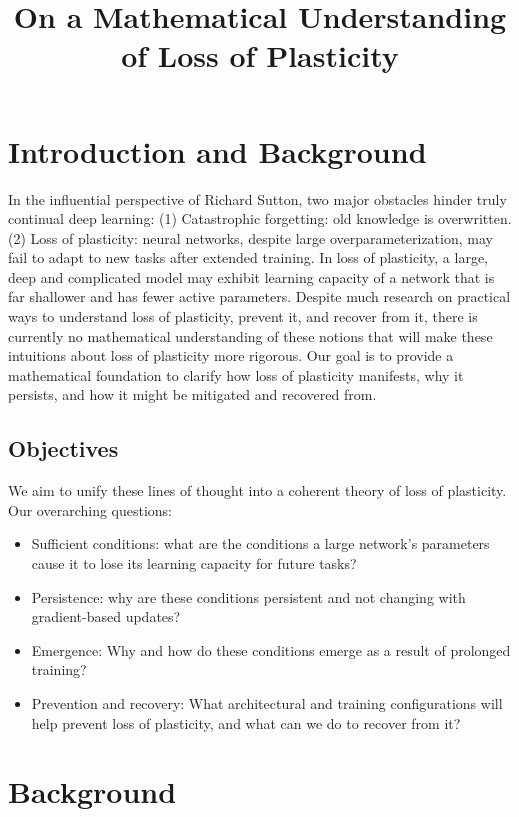 \documentclass[11pt]{article}
\title{On a Mathematical Understanding of Loss of Plasticity}
\date{}
\begin{document}
\maketitle

\section{Introduction and Background}

In the influential perspective of Richard Sutton, two major obstacles hinder truly continual deep learning:
(1) Catastrophic forgetting: old knowledge is overwritten.
(2) Loss of plasticity: neural networks, despite large overparameterization, may fail to adapt to new tasks after extended training. In loss of plasticity, a large, deep and complicated model may exhibit learning capacity of a network that is far shallower and has fewer active parameters. Despite much research on practical ways to understand loss of plasticity, prevent it, and recover from it, there is currently no mathematical understanding of these notions that will make these intuitions about loss of plasticity more rigorous. Our goal is to provide a mathematical foundation to clarify how loss of plasticity manifests, why it persists, and how it might be mitigated and recovered from.

\subsection{Objectives}
We aim to unify these lines of thought into a coherent theory of loss of plasticity. Our overarching questions:
\begin{itemize}
    \item Sufficient conditions: what are the conditions a large network's parameters cause it to lose its learning capacity for future tasks?
    \item Persistence: why are these conditions persistent and not changing with gradient-based updates?
    \item Emergence: Why and how do these conditions emerge as a result of prolonged training?
    \item Prevention and recovery: What architectural and training configurations will help prevent loss of plasticity, and what can we do to recover from it?
\end{itemize}

\section{Background}
\end{document}

